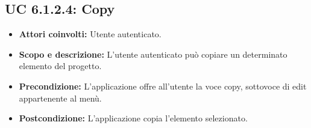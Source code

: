 \subsection{UC 6.1.2.4: Copy}
\begin{itemize}
		\item \textbf{Attori coinvolti:} Utente autenticato. \\
		\item \textbf{Scopo e descrizione:} L'utente autenticato può copiare un determinato elemento del progetto. \\
		\item \textbf{Precondizione:} L'applicazione offre all'utente la voce copy, sottovoce di edit appartenente al menù. \\
		\item \textbf{Postcondizione:} L'applicazione copia l'elemento selezionato. \\
\end{itemize}
